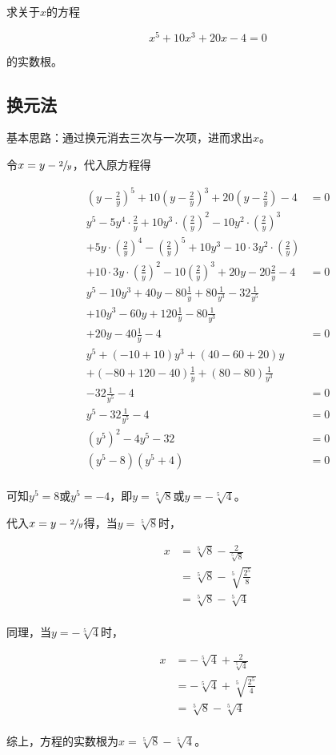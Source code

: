 

求关于$x$的方程

\[ x^5 + 10x^3 + 20x - 4 = 0 \]

的实数根。


\subsection{换元法}

基本思路：通过换元消去三次与一次项，进而求出$x$。

令$x = y - \sfrac2y$，代入原方程得

\begin{align*}
  \left(y - \frac2y\right)^5 + 10\left(y - \frac2y\right)^3 + 20\left(y - \frac2y\right) - 4 &= 0 \\
  y^5 - 5y^4\cdot\frac2y + 10y^3\cdot\left(\frac2y\right)^2 - 10y^2\cdot\left(\frac2y\right)^3 \\
  + 5y\cdot\left(\frac2y\right)^4 - \left(\frac2y\right)^5 + 10y^3 - 10\cdot3y^2\cdot\left(\frac2y\right) \\
  + 10\cdot3y\cdot\left(\frac2y\right)^2 - 10\left(\frac2y\right)^3 + 20y - 20\frac2y - 4 &= 0 \\
  y^5 - 10y^3 + 40y - 80\frac1y + 80\frac1{y^3} - 32\frac1{y^5} \\
  + 10y^3 - 60y + 120\frac1y - 80\frac1{y^3} \\
  + 20y - 40\frac1y - 4 &= 0 \\
  y^5 + (-10 + 10)y^3 + (40 - 60 + 20)y \\
  + (-80 + 120 - 40)\frac1y + (80 - 80)\frac1{y^3} \\
  - 32\frac1{y^5} - 4 &= 0 \\
  y^5 - 32\frac1{y^5} - 4 &= 0 \\
  \left(y^5\right)^2 - 4y^5 - 32 &= 0 \\
  \left(y^5 - 8\right)\left(y^5 + 4\right) &= 0 \\
\end{align*}

可知$y^5 = 8$或$y^5 = -4$，即$y = \sqrt[5]8$或$y = -\sqrt[5]4$。

代入$x = y - \sfrac2y$得，当$y = \sqrt[5]8$时，

\begin{align*}
  x &= \sqrt[5]8 - \frac2{\sqrt[5]8} \\
  &= \sqrt[5]8 - \sqrt[5]{\frac{2^5}8} \\
  &= \sqrt[5]8 - \sqrt[5]4 \\
\end{align*}

同理，当$y = -\sqrt[5]4$时，

\begin{align*}
  x &= -\sqrt[5]4 + \frac2{\sqrt[5]4} \\
  &= -\sqrt[5]4 + \sqrt[5]{\frac{2^5}4} \\
  &= \sqrt[5]8 - \sqrt[5]4 \\
\end{align*}

综上，方程的实数根为$x = \sqrt[5]8 - \sqrt[5]4$。
